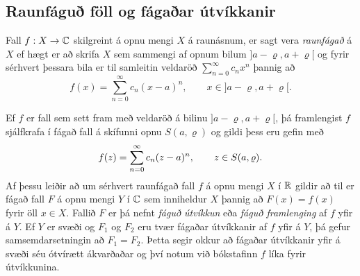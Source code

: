\subsection*{Raunfáguð föll og fágaðar útvíkkanir}

\begin{sk}
Fall $f:X\to {\mathbb C}$ skilgreint á opnu mengi $X$ á raunásnum,  er sagt
vera {\it raunfágað} á $X$ ef hægt er að skrifa $X$
sem sammengi af opnum bilum $]a-\varrho,a+\varrho[$  og fyrir sérhvert
þessara bila er  til samleitin veldaröð $\sum_{n=0}^\infty c_nx^n$
þannig að
\begin{equation*}f(x)= \sum\limits_{n=0}^\infty c_n(x-a)^n, \qquad x\in
]a-\varrho,a+\varrho[.
\label{3.1.2}
\end{equation*}
\end{sk}

Ef $f$ er fall sem sett fram með veldaröð á bilinu
$]a-\varrho,a+\varrho[$, þá framlengist $f$ sjálfkrafa í fágað fall
á skífunni opnu $S(a,\varrho)$ og gildi þess eru gefin með 
$$f(z)=\sum\limits_{n=0}\sp\infty c_n(z-a)\sp n, \qquad z\in
S(a,\varrho).
$$
Af þessu leiðir að um sérhvert raunfágað fall $f$ á opnu mengi $X$ í
${\mathbb R}$ gildir að til er fágað fall $F$ á opnu mengi $Y$ í ${\mathbb C}$ sem
inniheldur $X$ þannig að $F(x)=f(x)$ fyrir öll $x\in X$. 
Fallið $F$ er þá nefnt {\it fáguð útvíkkun} eða {\it fáguð
framlenging}  af $f$ yfir á $Y$.  Ef $Y$ er svæði og $F_1$ og $F_2$ eru
tvær fágaðar útvíkkanir  af $f$ yfir á $Y$, þá gefur
samsemdarsetningin  að $F_1=F_2$.  Þetta segir okkur að fágaðar
útvíkkanir  yfir á svæði séu ótvírætt ákvarðaðar og því notum við
bókstafinn $f$ líka fyrir útvíkkunina. 

